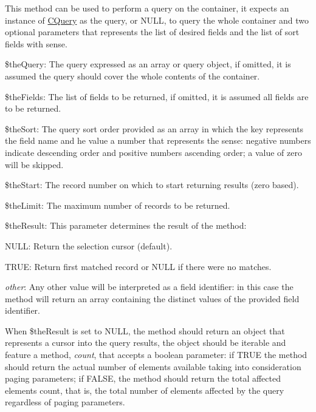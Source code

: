 This method can be used to perform a query on the container, it expects an instance of \hyperlink{class_c_query}{C\-Query} as the query, or {\ttfamily N\-U\-L\-L}, to query the whole container and two optional parameters that represents the list of desired fields and the list of sort fields with sense.


\begin{DoxyItemize}
\item {\ttfamily \$the\-Query}\-: The query expressed as an array or query object, if omitted, it is assumed the query should cover the whole contents of the container. 
\item {\ttfamily \$the\-Fields}\-: The list of fields to be returned, if omitted, it is assumed all fields are to be returned. 
\item {\ttfamily \$the\-Sort}\-: The query sort order provided as an array in which the key represents the field name and he value a number that represents the sense\-: negative numbers indicate descending order and positive numbers ascending order; a value of zero will be skipped. 
\item {\ttfamily \$the\-Start}\-: The record number on which to start returning results (zero based). 
\item {\ttfamily \$the\-Limit}\-: The maximum number of records to be returned. 
\item {\ttfamily \$the\-Result}\-: This parameter determines the result of the method\-: 
\begin{DoxyItemize}
\item {\ttfamily N\-U\-L\-L}\-: Return the selection cursor (default). 
\item {\ttfamily T\-R\-U\-E}\-: Return first matched record or {\ttfamily N\-U\-L\-L} if there were no matches. 
\item {\itshape other}\-: Any other value will be interpreted as a field identifier\-: in this case the method will return an array containing the distinct values of the provided field identifier. 
\end{DoxyItemize}
\end{DoxyItemize}

When {\ttfamily \$the\-Result} is set to {\ttfamily N\-U\-L\-L}, the method should return an object that represents a cursor into the query results, the object should be iterable and feature a method, {\itshape count}, that accepts a boolean parameter\-: if {\ttfamily T\-R\-U\-E} the method should return the actual number of elements available taking into consideration paging parameters; if {\ttfamily F\-A\-L\-S\-E}, the method should return the total affected elements count, that is, the total number of elements affected by the query regardless of paging parameters.


